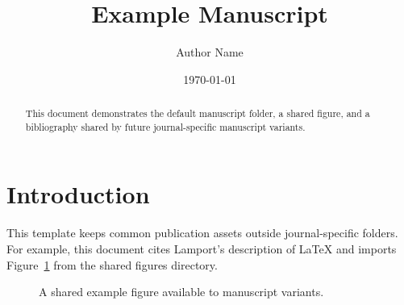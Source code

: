 \documentclass{article}
\title{Example Manuscript}
\author{Author Name}
\date{\today}
\begin{document}
\maketitle

\begin{abstract}
This document demonstrates the default manuscript folder, a shared figure, and
a bibliography shared by future journal-specific manuscript variants.
\end{abstract}

\section{Introduction}

This template keeps common publication assets outside journal-specific folders.
For example, this document cites Lamport's description of \LaTeX{}
\cite{lamport1986latex} and imports Figure~\ref{fig:example} from the shared
figures directory.

\begin{figure}[htbp]
  \centering
  
  \caption{A shared example figure available to manuscript variants.}
  \label{fig:example}
\end{figure}



\end{document}
